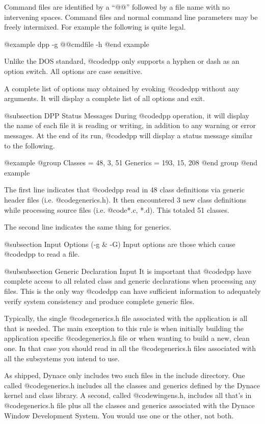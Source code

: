 Command files are identified by a ``@@'' followed by a file name with
no intervening spaces.  Command files and normal command line
parameters may be freely intermixed.  For example the following
is quite legal.

@example
        dpp -g @@cmdfile -h
@end example

Unlike the DOS standard, @code{dpp} only supports a hyphen or dash
as an option switch.  All options are case sensitive.

A complete list of options may obtained by evoking @code{dpp} without
any arguments.  It will display a complete list of all options and
exit.

@subsection DPP Status Messages
During @code{dpp} operation, it will display the name of each file
it is reading or writing, in addition to any warning or error messages.
At the end of its run, @code{dpp} will display a status message similar
to the following.

@example
@group
Classes  = 48, 3, 51
Generics = 193, 15, 208
@end group
@end example

The first line indicates that @code{dpp} read in 48 class definitions
via generic header files (i.e. @code{generics.h}).  It then encountered
3 new class definitions while processing source files
(i.e. @code{*.c, *.d}).  This totaled 51 classes.

The second line indicates the same thing for generics.


@subsection Input Options (-g & -G)
Input options are those which cause @code{dpp} to read a file.

@subsubsection Generic Declaration Input
It is important that @code{dpp} have complete access to all related
class and generic declarations when processing any files.  This is
the only way @code{dpp} can have sufficient information to adequately
verify system consistency and produce complete generic files.

Typically, the single @code{generics.h} file associated with the application
is all that is needed.  The main exception to this rule is when initially
building the application specific @code{generics.h} file or when wanting
to build a new, clean one.  In that case you should read in all the
@code{generics.h} files associated with all the subsystems you intend
to use.

As shipped, Dynace only includes two such files in the include directory.
One called @code{generics.h} includes all the classes and generics
defined by the Dynace kernel and class library.  A second, called
@code{wingens.h}, includes all that's in @code{generics.h} file plus
all the classes and generics associated with the Dynace Window
Development System.  You would use one or the other, not both.

